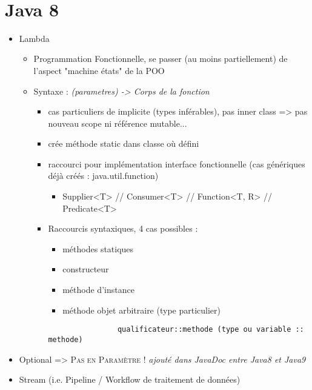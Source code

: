 \documentclass[11pt,twoside,a4paper]{article}
\begin{document}
\begin{landscape}
\begin{multicols}{2}
	\vfill ~\\
	
	\columnbreak
	
	\section*{Java 8}
	\begin{itemize}
		\item Lambda
		\begin{itemize}
			\item[] Programmation Fonctionnelle, se passer (au moins partiellement) de l'aspect "machine  {\'e}tats" de la POO
			\item[] Syntaxe : \emph{(parametres) -> {Corps de la fonction }}
			\begin{itemize}
				\item[] cas particuliers de implicite (types inf{\'e}rables), pas inner class => pas nouveau scope ni r{\'e}f{\'e}rence mutable...
				\item[] cr{\'e}e m{\'e}thode static dans classe o{\`u} d{\'e}fini
				\item[] raccourci pour impl{\'e}mentation interface fonctionnelle (cas g{\'e}n{\'e}riques d{\'e}j{\`a} cr{\'e}{\'e}s : java.util.function)
				\begin{itemize}
					\footnotesize
					\item[] Supplier<T> // Consumer<T> // Function<T, R> // Predicate<T>
				\end{itemize}
				\item[] Raccourcis syntaxiques, 4 cas possibles : 
				\begin{itemize}
					\item[] m{\'e}thodes statiques
					\item[] constructeur
					\item[] m{\'e}thode d'instance
					\item[] m{\'e}thode objet arbitraire (type particulier)
				\end{itemize}
				\begin{verbatim}
				qualificateur::methode (type ou variable :: methode)
				\end{verbatim}
			\end{itemize}
		\end{itemize}
		\item Optional => \textsc{Pas en Param{\`e}tre} ! \emph{\footnotesize ajout{\'e} dans JavaDoc entre Java8 et Java9}
		\item Stream ({\footnotesize i.e. Pipeline / Workflow de traitement de donn{\'e}es})

\end{itemize}
\end{multicols}
\end{landscape}
\end{document}
